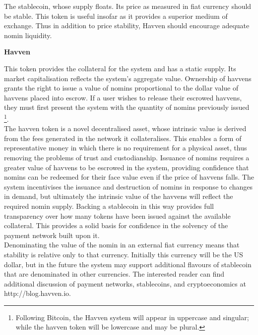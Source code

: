 \vspace{1mm}

\noindent The stablecoin, whose supply floats. Its price as measured in fiat currency should be stable. This token is useful insofar as it provides a superior medium of exchange. Thus in addition to price stability, Havven should encourage adequate nomin liquidity.

\vspace{2mm}

\noindent \textbf{Havven}

\vspace{1mm}

\noindent This token provides the collateral for the system and has a static supply. Its market capitalisation reflects the system’s aggregate value. Ownership of havvens grants the right to issue a value of nomins proportional to the dollar value of havvens placed into escrow. If a user wishes to release their escrowed havvens, they must first present the system with the quantity of nomins previously issued \footnote{Following Bitcoin, the Havven system will appear in uppercase and singular; while the havven token will be lowercase and may be plural.}. \\

\noindent The havven token is a novel decentralised asset, whose intrinsic value is derived from the fees generated in the network it collateralises. This enables a form of representative money in which there is no requirement for a physical asset, thus removing the problems of trust and custodianship. Issuance of nomins requires a greater value of havvens to be escrowed in the system, providing confidence that nomins can be redeemed for their face value even if the price of havvens falls. The system incentivises the issuance and destruction of nomins in response to changes in demand, but ultimately the intrinsic value of the havvens will reflect the required nomin supply. Backing a stablecoin in this way provides full transparency over how many tokens have been issued against the available collateral. This provides a solid basis for confidence in the solvency of the payment network built upon it.\\

\noindent Denominating the value of the nomin in an external fiat currency means that stability is relative only to that currency. Initially this currency will be the US dollar, but in the future the system may support additional flavours of stablecoin that are denominated in other currencies. The interested reader can find additional discussion of payment networks, stablecoins, and cryptoeconomics at http://blog.havven.io.

\pagebreak
